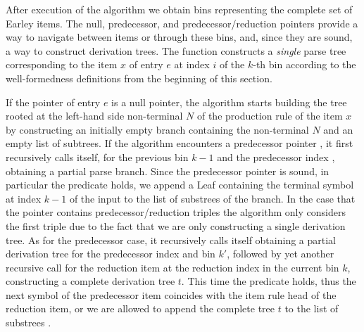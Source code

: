 \begin{isabellebody}
\isadelimproof
%
\endisadelimproof
%
\isatagproof
%
\endisatagproof
{\isafoldproof}%
%
\isadelimproof
%
\endisadelimproof
%
\isadelimdocument
%
\endisadelimdocument
%
\isatagdocument
%
\isamarkuptrue%
%
\endisatagdocument
{\isafolddocument}%
%
\isadelimdocument
%
\endisadelimdocument
%
\begin{isamarkuptext}%
After execution of the  algorithm we obtain bins representing the complete set
of Earley items. The null, predecessor, and predecessor/reduction pointers provide a way to navigate
between items or through these bins, and, since they are sound, a way to construct derivation trees.
The function  constructs a \textit{single} parse tree corresponding to the item $x$ of entry $e$ at index $i$ of the $k$-th bin according to the
well-formedness definitions from the beginning of this section.

If the pointer of entry $e$ is a null pointer, the algorithm starts building the tree rooted at
the left-hand side non-terminal $N$ of the production rule of the item $x$ by constructing an initially
empty branch containing the non-terminal $N$ and an empty list of subtrees. If the algorithm encounters
a predecessor pointer , it first recursively calls itself, for the previous bin $k-1$ and the
predecessor index , obtaining a partial parse branch. Since the predecessor pointer is sound,
in particular the  predicate holds, we append a Leaf containing the terminal symbol at index
$k-1$ of the input \isa{{\isasymomega}} to the list of substrees of the branch. In the case that
the pointer contains predecessor/reduction triples the algorithm only considers the first triple
 due to the fact that we are only constructing a single derivation tree. As for the predecessor
case, it recursively calls itself obtaining a partial derivation tree  for the predecessor index 
and bin $k'$, followed by yet another recursive call for the reduction item at the reduction index 
in the current bin $k$, constructing a complete derivation tree $t$. This time the 
predicate holds, thus the next symbol of the predecessor item coincides with the item rule head of
the reduction item, or we are allowed to append the complete tree $t$ to the list of substrees .


\end{isamarkuptext}
\end{isabellebody}
